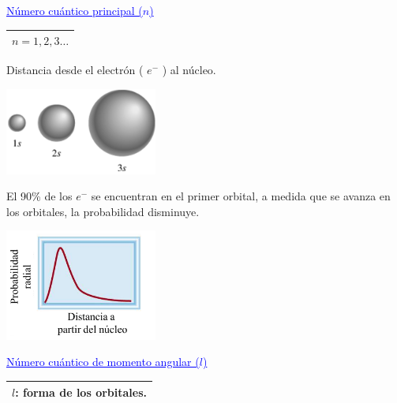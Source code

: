         \begin{center} \textcolor{blue}{\underline{Número cuántico principal ($n$)}} \end{center}
            \begin{center} 
                \begin{tabular}{| c |}
                    \hline
                    $n = 1,2,3 \dots $ \\
                    \hline
                \end{tabular}
            \end{center} 
            \indent Distancia desde el electrón ( $e^-$ ) al núcleo.   
            \begin{center} \includegraphics[width=5cm]{./imagenes/numeroCuanticoPrincipal.png} \hfill \end{center} 
            \hspace{10pt} El 90\% de los $e^-$ se encuentran en el primer orbital, a medida que se avanza en los orbitales, la probabilidad disminuye.
            \saltoPag%
            \begin{center} \includegraphics[width=5cm]{./imagenes/encontrarElectronOrbital.png} \end{center}

        \begin{center} \textcolor{blue}{\underline{Número cuántico de momento angular ($l$)}} \end{center}
            \begin{center} 
                \begin{tabular}{| c |}
                    \hline
                    $l$: forma de los orbitales. \\
                    \hline
                \end{tabular}
            \end{center}

